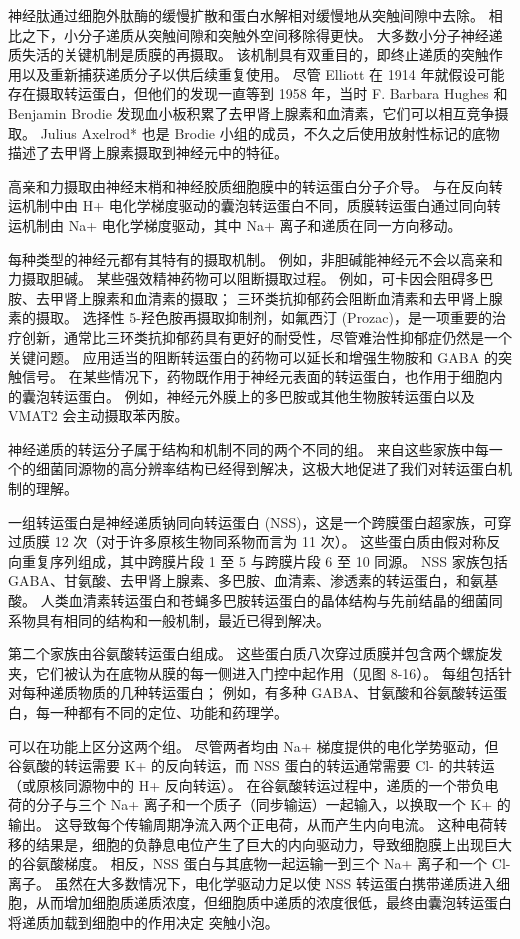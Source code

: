 神经肽通过细胞外肽酶的缓慢扩散和蛋白水解相对缓慢地从突触间隙中去除。
相比之下，小分子递质从突触间隙和突触外空间移除得更快。
大多数小分子神经递质失活的关键机制是质膜的再摄取。 
该机制具有双重目的，即终止递质的突触作用以及重新捕获递质分子以供后续重复使用。
尽管 Elliott 在 1914 年就假设可能存在摄取转运蛋白，但他们的发现一直等到 1958 年，当时 F. Barbara Hughes 和 Benjamin Brodie 发现血小板积累了去甲肾上腺素和血清素，它们可以相互竞争摄取。
Julius Axelrod* 也是 Brodie 小组的成员，不久之后使用放射性标记的底物描述了去甲肾上腺素摄取到神经元中的特征。


高亲和力摄取由神经末梢和神经胶质细胞膜中的转运蛋白分子介导。
与在反向转运机制中由 H+ 电化学梯度驱动的囊泡转运蛋白不同，质膜转运蛋白通过同向转运机制由 Na+ 电化学梯度驱动，其中 Na+ 离子和递质在同一方向移动。


每种类型的神经元都有其特有的摄取机制。
例如，非胆碱能神经元不会以高亲和力摄取胆碱。
某些强效精神药物可以阻断摄取过程。
例如，可卡因会阻碍多巴胺、去甲肾上腺素和血清素的摄取；
三环类抗抑郁药会阻断血清素和去甲肾上腺素的摄取。
选择性 5-羟色胺再摄取抑制剂，如氟西汀 (Prozac)，是一项重要的治疗创新，通常比三环类抗抑郁药具有更好的耐受性，尽管难治性抑郁症仍然是一个关键问题。
应用适当的阻断转运蛋白的药物可以延长和增强生物胺和 GABA 的突触信号。
在某些情况下，药物既作用于神经元表面的转运蛋白，也作用于细胞内的囊泡转运蛋白。
例如，神经元外膜上的多巴胺或其他生物胺转运蛋白以及 VMAT2 会主动摄取苯丙胺。


神经递质的转运分子属于结构和机制不同的两个不同的组。
来自这些家族中每一个的细菌同源物的高分辨率结构已经得到解决，这极大地促进了我们对转运蛋白机制的理解。


一组转运蛋白是神经递质钠同向转运蛋白 (NSS)，这是一个跨膜蛋白超家族，可穿过质膜 12 次（对于许多原核生物同系物而言为 11 次）。
这些蛋白质由假对称反向重复序列组成，其中跨膜片段 1 至 5 与跨膜片段 6 至 10 同源。
NSS 家族包括 GABA、甘氨酸、去甲肾上腺素、多巴胺、血清素、渗透素的转运蛋白，和氨基酸。
人类血清素转运蛋白和苍蝇多巴胺转运蛋白的晶体结构与先前结晶的细菌同系物具有相同的结构和一般机制，最近已得到解决。


第二个家族由谷氨酸转运蛋白组成。
这些蛋白质八次穿过质膜并包含两个螺旋发夹，它们被认为在底物从膜的每一侧进入门控中起作用（见图 8-16）。
每组包括针对每种递质物质的几种转运蛋白；
例如，有多种 GABA、甘氨酸和谷氨酸转运蛋白，每一种都有不同的定位、功能和药理学。


可以在功能上区分这两个组。
尽管两者均由 Na+ 梯度提供的电化学势驱动，但谷氨酸的转运需要 K+ 的反向转运，而 NSS 蛋白的转运通常需要 Cl- 的共转运（或原核同源物中的 H+ 反向转运）。
在谷氨酸转运过程中，递质的一个带负电荷的分子与三个 Na+ 离子和一个质子（同步输运）一起输入，以换取一个 K+ 的输出。
这导致每个传输周期净流入两个正电荷，从而产生内向电流。
这种电荷转移的结果是，细胞的负静息电位产生了巨大的内向驱动力，导致细胞膜上出现巨大的谷氨酸梯度。
相反，NSS 蛋白与其底物一起运输一到三个 Na+ 离子和一个 Cl- 离子。
虽然在大多数情况下，电化学驱动力足以使 NSS 转运蛋白携带递质进入细胞，从而增加细胞质递质浓度，但细胞质中递质的浓度很低，最终由囊泡转运蛋白将递质加载到细胞中的作用决定 突触小泡。


